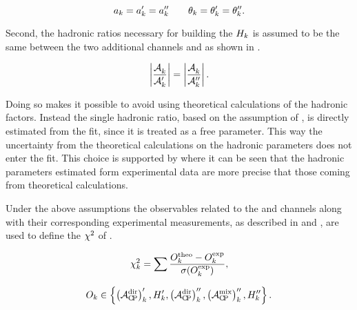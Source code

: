 \begin{equation}
a_k= a_k' = a_k'' \qquad \theta_k = \theta_k' = \theta_k''.
\label{su3_apply}
\end{equation}

\noindent Second, the hadronic ratios necessary for building the $H_{k}$ is assumed to be the same between
the two additional channels \BsJpsiKst and \BdJpsiRho as shown in .

\begin{equation}
  \centering
  \hadRatio{k}{}{\prime} =
  \hadRatio{k}{}{\prime\prime}.
    \label{had_ratios_assuption}
\end{equation}

\noindent Doing so makes it possible to avoid using theoretical calculations of the hadronic factors.
Instead the single hadronic ratio, based on the assumption of , is directly
estimated from the fit, since it is treated as a free parameter. This way the uncertainty from the theoretical
calculations on the hadronic parameters does not enter the fit. This choice is supported by \cite{DeBruyn-thesis}
where it can be seen that the hadronic parameters estimated form experimental data are more precise
that those coming from theoretical calculations.

Under the above assumptions the observables related to the \BsJpsiKst and \BdJpsiRho channels along
with their corresponding experimental measurements, as described in  and
, are used to define the $\chi^2$ of .

\begin{equation}
  \centering
  \chisq_k = \sum \frac{O^{\rm theo}_k - O^{\rm exp}_k} {\sigma(O^{\rm exp}_k)},
  \label{chisq_form}
\end{equation}


\begin{equation}
  \centering
  O_k \in \left\{ \parenthesis{\Acp{\rm dir}}'_k, \Hobs{k}', \parenthesis{\Acp{\rm dir}}''_k, \parenthesis{\Acp{\rm mix}}''_k, \Hobs{k}'' \right\}.
  \label{chisq_form_with}
\end{equation}

